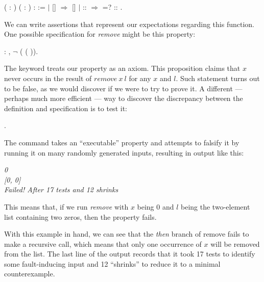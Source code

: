 \begin{coqdoccode}
	\coqdocnoindent
	  ( : ) ( :  ) :   :=\coqdoceol
	\coqdocindent{1.00em}
	  \coqdoceol
	\coqdocindent{2.00em}
	\ensuremath{|} []   \ensuremath{\Rightarrow} []\coqdoceol
	\coqdocindent{2.00em}
	\ensuremath{|} :: \ensuremath{\Rightarrow}   =?      ::   \coqdoceol
	\coqdocindent{1.00em}
	.\coqdoceol
\end{coqdoccode}

We can write assertions that represent our expectations regarding this function. One possible specification for \emph{remove} might be this property:

\begin{coqdoccode}
	\coqdocnoindent
	  : \coqdockw{\ensuremath{\forall}}  ,  \ensuremath{\lnot} (  (  )).\coqdoceol
\end{coqdoccode}

The keyword  treats our property  as an axiom. This proposition claims that $ x $ never occurs in the result of $ \mathit{remove} \ x \ l $ for any $ x $ and $ l $. Such statement turns out to be false, as we would discover if we were to try to prove it. A different — perhaps much more efficient — way to discover the discrepancy between the definition and specification is to test it:

\begin{coqdoccode}
	\coqdocnoindent
	 .\coqdoceol
\end{coqdoccode}

The  command takes an ``executable'' property and attempts to falsify it by running it on many randomly generated inputs, resulting in output like this:

\begin{tabbing}
	\emph{0} \\
	\emph{[0, 0]} \\
	\emph{Failed! After 17 tests and 12 shrinks}
\end{tabbing}

This means that, if we run \emph{remove} with $ x $ being 0 and $ l $ being the two-element list containing two zeros, then the property  fails.

With this example in hand, we can see that the \emph{then} branch of remove fails to make a recursive call, which means that only one occurrence of $ x $ will be removed from the list. The last line of the output records that it took 17 tests to identify some fault-inducing input and 12 ``shrinks'' to reduce it to a minimal counterexample.

